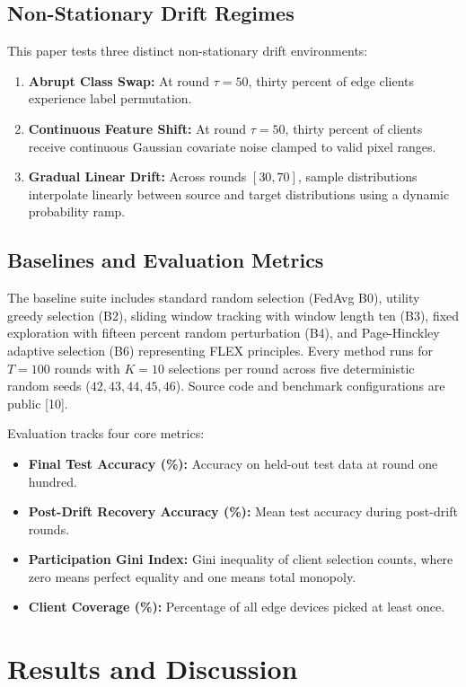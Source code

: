 \documentclass[conference]{IEEEtran}
\begin{document}
\subsection{Non-Stationary Drift Regimes}
This paper tests three distinct non-stationary drift environments:
\begin{enumerate}
    \item \textbf{Abrupt Class Swap:} At round $\tau=50$, thirty percent of edge clients experience label permutation.
    \item \textbf{Continuous Feature Shift:} At round $\tau=50$, thirty percent of clients receive continuous Gaussian covariate noise clamped to valid pixel ranges.
    \item \textbf{Gradual Linear Drift:} Across rounds $[30, 70]$, sample distributions interpolate linearly between source and target distributions using a dynamic probability ramp.
\end{enumerate}

\subsection{Baselines and Evaluation Metrics}
The baseline suite includes standard random selection (FedAvg B0), utility greedy selection (B2), sliding window tracking with window length ten (B3), fixed exploration with fifteen percent random perturbation (B4), and Page-Hinckley adaptive selection (B6) representing FLEX principles. Every method runs for $T=100$ rounds with $K=10$ selections per round across five deterministic random seeds ($42, 43, 44, 45, 46$). Source code and benchmark configurations are public [10].

Evaluation tracks four core metrics:
\begin{itemize}
    \item \textbf{Final Test Accuracy (\%):} Accuracy on held-out test data at round one hundred.
    \item \textbf{Post-Drift Recovery Accuracy (\%):} Mean test accuracy during post-drift rounds.
    \item \textbf{Participation Gini Index:} Gini inequality of client selection counts, where zero means perfect equality and one means total monopoly.
    \item \textbf{Client Coverage (\%):} Percentage of all edge devices picked at least once.
\end{itemize}

\section{Results and Discussion}
\end{document}
